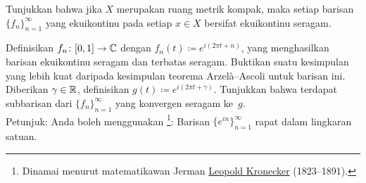 \begin{exercise}
Tunjukkan bahwa jika $X$ merupakan ruang metrik kompak, maka
setiap barisan $\{ f_n \}_{n=1}^\infty$ yang ekuikontinu pada setiap $x \in X$
bersifat ekuikontinu seragam.
\end{exercise}

\begin{exercise}
Definisikan $f_n \colon [0,1] \to {\mathbb{C}}$ dengan $f_n(t) \coloneqq e^{i(2\pi t + n)}$,
yang menghasilkan barisan ekuikontinu seragam dan terbatas seragam.
Buktikan suatu kesimpulan yang lebih kuat daripada kesimpulan teorema Arzel\`a--Ascoli untuk barisan ini.
Diberikan $\gamma \in {\mathbb{R}}$,
definisikan $g(t) \coloneqq e^{i(2\pi t + \gamma)}$.  Tunjukkan bahwa terdapat
subbarisan dari $\{ f_n \}_{n=1}^\infty$ yang konvergen seragam ke~$g$.
\\
Petunjuk: Anda boleh menggunakan \emph{}\footnote{%
Dinamai menurut matematikawan Jerman
\href{https://en.wikipedia.org/wiki/Leopold_Kronecker}{Leopold Kronecker}
(1823--1891).}:
Barisan $\{ e^{in} \}_{n=1}^\infty$ rapat dalam lingkaran satuan.
\end{exercise}

